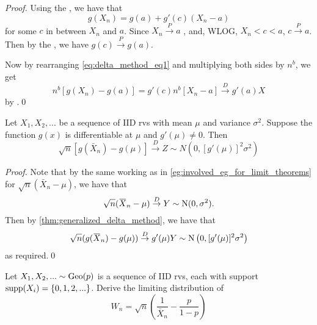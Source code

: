 \documentclass[notoc,notitlepage]{tufte-book}
\newcommand{\convd}{\overset{D}{\to}}
\newcommand{\convp}{\overset{P}{\to}}
\begin{document}
\begin{proof}
  Using the , we have that
  \begin{equation}\label{eq:delta_method_eq1}
    g(X_n) = g(a) + g'(c) ( X_n - a )
  \end{equation}
  for some $c$ in between $X_n$ and $a$. Since $X_n \convp a$ , and, WLOG, $X_n < c < a$, $c \convp a$. Then by the , we have $g(c) \convp g(a)$.

  \noindent Now by rearranging \cref{eq:delta_method_eq1} and multiplying both sides by $n^b$, we get
  \begin{equation*}
    n^b [ g(X_n) - g(a) ] = g'(c) n^b [ X_n - a ] \convd g'(a) X
  \end{equation*}
  by .\qed
\end{proof}

\begin{crly}
\label{crly:_delta_method}
  Let $X_1, X_2, ...$ be a sequence of IID rvs with mean $\mu$ and variance $\sigma^2$. Suppose the function $g(x)$ is differentiable at $\mu$ and $g'(\mu) \neq 0$. Then
  \begin{equation*}
    \sqrt{n} [ g(\bar{X}_n) - g(\mu) ] \convd Z \sim N\left( 0, [ g'(\mu) ]^2 \sigma^2 \right)
  \end{equation*}
\end{crly}

\begin{proof}
  Note that by the same working as in \cref{eg:involved_eg_for_limit_theorems} for $\sqrt{n} ( \bar{X}_n - \mu )$, we have that
  \begin{equation*}
    \sqrt{n} ( \bar{X}_n - \mu ) \convd Y \sim \Nor(0, \sigma^2).
  \end{equation*}
  Then by \cref{thm:generalized_delta_method}, we have that
  \begin{equation*}
    \sqrt{n} ( g(\bar{X}_n) - g(\mu) ) \convd g'(\mu) Y \sim \Nor\left( 0, [g'(\mu)]^2 \sigma^2 \right)
  \end{equation*}
  as required.\qed
\end{proof}

\begin{eg}[Example 5.14]
  Let $X_1, X_2, ... \sim \operatorname{Geo}(p)$ is a sequence of IID rvs, each with support $\operatorname{supp}(X_i) = \{0, 1, 2, ...\}$. Derive the limiting distribution of
  \begin{equation*}
    W_n = \sqrt{n} \left( \frac{1}{\bar{X}_n} - \frac{p}{1 - p} \right)
  \end{equation*}
\end{eg}
\end{document}
